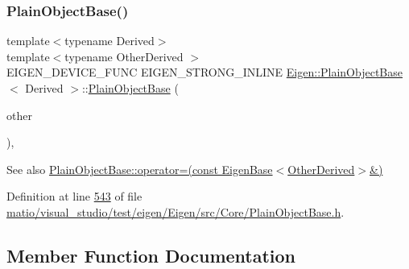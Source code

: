 \mbox{\label{class_eigen_1_1_plain_object_base_a31d65efdbeaf9c7693bf6ae204d788f2}} 
\subsubsection{\texorpdfstring{Plain\+Object\+Base()}{PlainObjectBase()}\hspace{0.1cm}{\footnotesize\ttfamily [6/6]}}
{\footnotesize\ttfamily template$<$typename Derived$>$ \\
template$<$typename Other\+Derived $>$ \\
E\+I\+G\+E\+N\+\_\+\+D\+E\+V\+I\+C\+E\+\_\+\+F\+U\+NC E\+I\+G\+E\+N\+\_\+\+S\+T\+R\+O\+N\+G\+\_\+\+I\+N\+L\+I\+NE \hyperlink{class_eigen_1_1_plain_object_base}{Eigen\+::\+Plain\+Object\+Base}$<$ Derived $>$\+::\hyperlink{class_eigen_1_1_plain_object_base}{Plain\+Object\+Base} (\begin{DoxyParamCaption}\item[{const \hyperlink{group___core___module_struct_eigen_1_1_eigen_base}{Eigen\+Base}$<$ Other\+Derived $>$ \&}]{other }\end{DoxyParamCaption})\hspace{0.3cm}{\ttfamily [inline]}, {\ttfamily [protected]}}

\begin{DoxySeeAlso}{See also}
\hyperlink{class_eigen_1_1_plain_object_base_a6d280056e43429f043e8b25262ee6153}{Plain\+Object\+Base\+::operator=(const Eigen\+Base$<$\+Other\+Derived$>$\&)} 
\end{DoxySeeAlso}


Definition at line \hyperlink{matio_2visual__studio_2test_2eigen_2_eigen_2src_2_core_2_plain_object_base_8h_source_l00543}{543} of file \hyperlink{matio_2visual__studio_2test_2eigen_2_eigen_2src_2_core_2_plain_object_base_8h_source}{matio/visual\+\_\+studio/test/eigen/\+Eigen/src/\+Core/\+Plain\+Object\+Base.\+h}.



\subsection{Member Function Documentation}
\mbox{\label{class_eigen_1_1_plain_object_base_aa77dab5e9e6ba9e39740e17cfae78a33}} 
